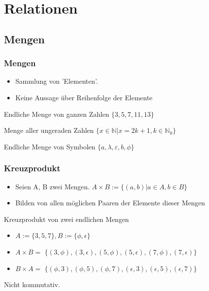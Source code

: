 \documentclass{beamer}
\begin{document}
\section{Relationen}
\subsection{Mengen}
\begin{frame}
  \frametitle{Mengen}
  \begin{definition}
    \begin{itemize}
      \item Sammlung von 'Elementen'.
      \item Keine Aussage über Reihenfolge der Elemente
    \end{itemize}
  \end{definition} \pause
  \begin{exampleblock}{Endliche Menge von ganzen Zahlen}
    $\{ 3, 5, 7, 11, 13\}$
  \end{exampleblock} \pause
  \begin{exampleblock}{Menge aller ungeraden Zahlen }
    $\{ x \in \mathbb{N} | x = 2k + 1, k \in \mathbb{N}_0 \}$
  \end{exampleblock} \pause
  \begin{exampleblock}{Endliche Menge von Symbolen}
    $\{ a, \lambda, \varepsilon, b, \phi\}$
  \end{exampleblock}
\end{frame}
\begin{frame}
  \frametitle{Kreuzprodukt}
  \begin{definition}
    \begin{itemize}
      \item Seien A, B zwei Mengen. $ A \times B := \{(a, b) | a \in A, b \in B\}$
      \item Bilden von allen möglichen Paaren der Elemente dieser Mengen
    \end{itemize}
  \end{definition} \pause
  \begin{exampleblock}{Kreuzprodukt von zwei endlichen Mengen}
    \begin{itemize}
    \item $ A := \{3, 5, 7\}, B := \{\phi, \epsilon\}$
    \item $ A \times B = $ \pause $\{(3, \phi), (3, \epsilon), (5, \phi), (5, \epsilon), (7, \phi), (7, \epsilon)\}$
    \item $ B \times A = $ \pause $\{(\phi, 3), (\phi, 5), (\phi, 7), (\epsilon, 3), (\epsilon, 5), (\epsilon, 7)\}$
    \end{itemize}
  \end{exampleblock}
  \begin{alertblock}{Nicht kommutativ.}
  \end{alertblock}
\end{frame}
\end{document}
